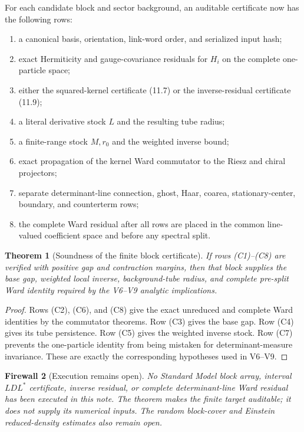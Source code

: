 \documentclass[11pt]{article}
\newtheorem{theorem}{Theorem}[section]
\newtheorem{firewall}[theorem]{Firewall}
\begin{document}
For each candidate block and sector background, an auditable certificate
now has the following rows:
\begin{enumerate}[label=\textnormal{(C\arabic*)}]
\item a canonical basis, orientation, link-word order, and serialized
input hash;
\item exact Hermiticity and gauge-covariance residuals for \(H_i\) on the
complete one-particle space;
\item either the squared-kernel certificate (11.7) or the inverse-residual
certificate (11.9);
\item a literal derivative stock \(L\) and the resulting tube radius;
\item a finite-range stock \(M,r_0\) and the weighted inverse bound;
\item exact propagation of the kernel Ward commutator to the Riesz and
chiral projectors;
\item separate determinant-line connection, ghost, Haar, coarea,
stationary-center, boundary, and counterterm rows;
\item the complete Ward residual after all rows are placed in the common
line-valued coefficient space and before any spectral split.
\end{enumerate}

\begin{theorem}[Soundness of the finite block certificate]
\label{thm:v11v11-soundness}
If rows (C1)--(C8) are verified with positive gap and contraction margins,
then that block supplies the base gap, weighted local inverse,
background-tube radius, and complete pre-split Ward identity required by
the V6--V9 analytic implications.
\end{theorem}

\begin{proof}
Rows (C2), (C6), and (C8) give the exact unreduced and complete Ward
identities by the commutator theorems.  Row (C3) gives the base gap.
Row (C4) gives its tube persistence.  Row (C5) gives the weighted inverse
stock.  Row (C7) prevents the one-particle identity from being mistaken
for determinant-measure invariance.  These are exactly the corresponding
hypotheses used in V6--V9.
\end{proof}

\begin{firewall}[Execution remains open]
\label{fw:v11v11-execution}
No Standard Model block array, interval \(LDL^*\) certificate, inverse
residual, or complete determinant-line Ward residual has been executed in
this note.  The theorem makes the finite target auditable; it does not
supply its numerical inputs.  The random block-cover and Einstein
reduced-density estimates also remain open.
\end{firewall}
\end{document}
